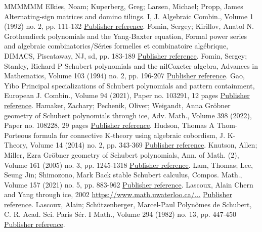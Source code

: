 \documentclass[11pt]{article}
\theoremstyle{definition}
\numberwithin{equation}{section}
\begin{document}
\begin{thebibliography}{MMMMMM}
 Elkies, Noam; Kuperberg, Greg; Larsen, Michael; Propp, James Alternating-sign matrices and domino tilings. I, J. Algebraic Combin., Volume 1 (1992) no. 2, pp. 111-132 \href{https://alco.centre-mersenne.org/articles/10.5802/alco.422/#EKLP92}{Publisher reference}.
 Fomin, Sergey; Kirillov, Anatol N. Grothendieck polynomials and the Yang-Baxter equation, Formal power series and algebraic combinatorics/Séries formelles et combinatoire algébrique, DIMACS, Piscataway, NJ, sd, pp. 183-189 \href{https://alco.centre-mersenne.org/articles/10.5802/alco.422/#FK94}{Publisher reference}.
 Fomin, Sergey; Stanley, Richard P Schubert polynomials and the nilCoxeter algebra, Advances in Mathematics, Volume 103 (1994) no. 2, pp. 196-207 \href{https://alco.centre-mersenne.org/articles/10.5802/alco.422/#FS94}{Publisher reference}.
 Gao, Yibo Principal specializations of Schubert polynomials and pattern containment, European J. Combin., Volume 94 (2021), Paper no. 103291, 12 pages \href{https://alco.centre-mersenne.org/articles/10.5802/alco.422/#Gao21}{Publisher reference}.
 Hamaker, Zachary; Pechenik, Oliver; Weigandt, Anna Gröbner geometry of Schubert polynomials through ice, Adv. Math., Volume 398 (2022), Paper no. 108228, 29 pages \href{https://alco.centre-mersenne.org/articles/10.5802/alco.422/#HPS22}{Publisher reference}.
 Hudson, Thomas A Thom-Porteous formula for connective K-theory using algebraic cobordism, J. K-Theory, Volume 14 (2014) no. 2, pp. 343-369 \href{https://alco.centre-mersenne.org/articles/10.5802/alco.422/#Hud14}{Publisher reference}.
 Knutson, Allen; Miller, Ezra Gröbner geometry of Schubert polynomials, Ann. of Math. (2), Volume 161 (2005) no. 3, pp. 1245-1318 \href{https://alco.centre-mersenne.org/articles/10.5802/alco.422/#KM05}{Publisher reference}.
 Lam, Thomas; Lee, Seung Jin; Shimozono, Mark Back stable Schubert calculus, Compos. Math., Volume 157 (2021) no. 5, pp. 883-962 \href{https://alco.centre-mersenne.org/articles/10.5802/alco.422/#LLS21}{Publisher reference}.
 Lascoux, Alain Chern and Yang through ice, 2002 \url{https://www.math.uwaterloo.ca/...} \href{https://alco.centre-mersenne.org/articles/10.5802/alco.422/#Las02}{Publisher reference}.
 Lascoux, Alain; Schützenberger, Marcel-Paul Polynômes de Schubert, C. R. Acad. Sci. Paris Sér. I Math., Volume 294 (1982) no. 13, pp. 447-450 \href{https://alco.centre-mersenne.org/articles/10.5802/alco.422/#LS82a}{Publisher reference}.

\end{thebibliography}
\end{document}
